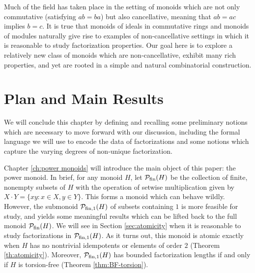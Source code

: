 
Much of the field has taken place in the setting of monoids which are not only commutative (satisfying $ab = ba$) but also cancellative, meaning that $ab = ac$ implies $b = c$.
It is true that monoids of ideals in commutative rings and monoids of modules naturally give rise to examples of non-cancellative settings in which it is reasonable to study factorization properties. 
Our goal here is to explore a relatively new class of monoids which are non-cancellative, exhibit many rich properties, and yet are rooted in a simple and natural combinatorial construction.


\section{Plan and Main Results}
We will conclude this chapter by defining and recalling some preliminary notions which are necessary to move forward with our discussion, including the formal language we will use to encode the data of factorizations and some notions which capture the varying degrees of non-unique factorization.

Chapter \ref{ch:power monoids} will introduce the main object of this paper: the power monoid.  
In brief, for any monoid $H$, let $\mathcal{P}_{\textrm{fin}}(H)$ be the collection of finite, nonempty subsets of $H$ with the operation of setwise multiplication given by $X\cdot Y = \{xy: x\in X, y\in Y\}$.  
This forms a monoid which can behave wildly.
However, the submonoid $\mathcal{P}_{\textrm{fin}, 1}(H)$ of subsets containing $1$ is more feasible for study, and yields some meaningful results which can be lifted back to the full monoid $\mathcal{P}_{\textrm{fin}}(H)$.
We will see in Section \ref{sec:atomicity} when it is reasonable to study factorizations in $\mathcal{P}_{\textrm{fin}, 1}(H)$.
As it turns out, this monoid is atomic exactly when $H$ has no nontrivial idempotents or elements of order $2$ (Theorem \ref{th:atomicity}).
Moreover, $\mathcal{P}_{\textrm{fin}, 1}(H)$ has bounded factorization lengths if and only if $H$ is torsion-free (Theorem \ref{thm:BF-torsion}).

